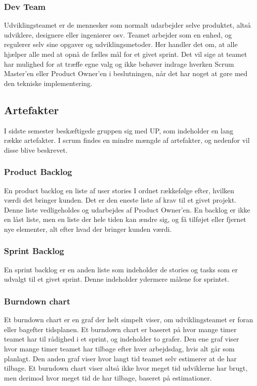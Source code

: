 \subsubsection{Dev Team}
Udviklingsteamet er de mennesker som normalt udarbejder selve produktet, altså udviklere, designere 
eller ingeniører osv. Teamet arbejder som en enhed, og regulerer selv sine opgaver og udviklingsmetoder. 
Her handler det om, at alle hjælper alle med at opnå de fælles mål for et givet sprint. Det vil sige 
at teamet har mulighed for at træffe egne valg og ikke behøver indrage hverken Scrum Master’en eller 
Product Owner’en i beslutningen, når det har noget at gøre med den tekniske implementering.

\subsection{Artefakter}
I sidste semester beskæftigede gruppen sig med UP, som indeholder en lang række artefakter. I scrum findes en mindre mængde af 
artefakter, og nedenfor vil disse blive beskrevet.

\subsubsection{Product Backlog}
En product backlog en liste af user stories I ordnet rækkefølge efter, hvilken værdi det bringer kunden. 
Det er den eneste liste af krav til et givet projekt. Denne liste vedligeholdes og udarbejdes af 
Product Owner’en. En backlog er ikke en låst liste, men en liste der hele tiden kan ændre sig, og få 
tilføjet eller fjernet nye elementer, alt efter hvad der bringer kunden værdi. 

\subsubsection{Sprint Backlog}
En sprint backlog er en anden liste som indeholder de stories og tasks som er udvalgt til et givet sprint. Denne indeholder ydermere målene for sprintet. 

\subsubsection{Burndown chart}
Et burndown chart er en graf der helt simpelt viser, om udviklingsteamet er foran eller bagefter tidsplanen. Et burndown chart er baseret på hvor mange timer 
teamet har til rådighed i et sprint, og indeholder to grafer. Den ene graf viser hvor mange timer teamet har tilbage efter hver arbejdsdag, hvis alt går som planlagt.
Den anden graf viser hvor langt tid teamet selv estimerer at de har tilbage. Et burndown chart viser altså ikke hvor meget tid udviklerne har brugt, men derimod hvor meget
tid de har tilbage, baseret på estimationer.

